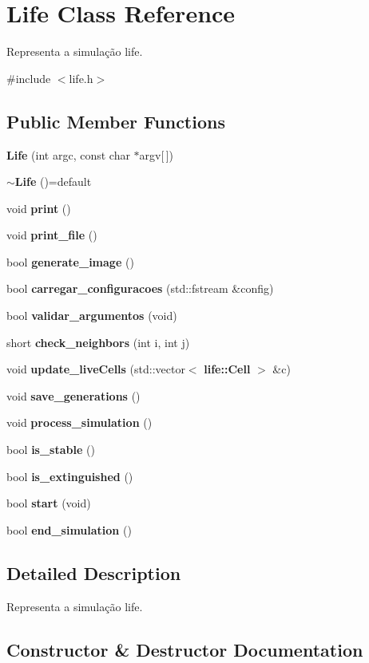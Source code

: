 \section{Life Class Reference}
\label{class_life}


Representa a simulação life.  




{\ttfamily \#include $<$life.\+h$>$}

\subsection*{Public Member Functions}
\begin{DoxyCompactItemize}
\item 
\textbf{ Life} (int argc, const char $\ast$argv[$\,$])
\item 
\textbf{ $\sim$\+Life} ()=default
\item 
void \textbf{ print} ()
\item 
void \textbf{ print\+\_\+file} ()
\item 
bool \textbf{ generate\+\_\+image} ()
\item 
bool \textbf{ carregar\+\_\+configuracoes} (std\+::fstream \&config)
\item 
bool \textbf{ validar\+\_\+argumentos} (void)
\item 
short \textbf{ check\+\_\+neighbors} (int i, int j)
\item 
void \textbf{ update\+\_\+live\+Cells} (std\+::vector$<$ \textbf{ life\+::\+Cell} $>$ \&c)
\item 
void \textbf{ save\+\_\+generations} ()
\item 
void \textbf{ process\+\_\+simulation} ()
\item 
bool \textbf{ is\+\_\+stable} ()
\item 
bool \textbf{ is\+\_\+extinguished} ()
\item 
bool \textbf{ start} (void)
\item 
bool \textbf{ end\+\_\+simulation} ()
\end{DoxyCompactItemize}


\subsection{Detailed Description}
Representa a simulação life. 

\subsection{Constructor \& Destructor Documentation}
\mbox{\label{class_life_a41479e494373b89882a604f7773c69ba}} 
